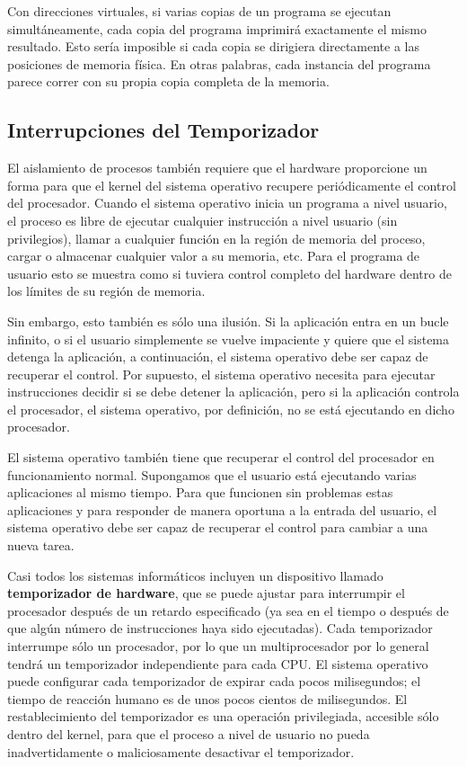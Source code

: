 \documentclass[10pt]{book}
\begin{document}
Con direcciones virtuales, si varias copias de un programa se ejecutan simultáneamente, cada copia del programa imprimirá exactamente el mismo resultado. Esto sería imposible si cada copia se dirigiera directamente a las posiciones de memoria física. En otras palabras, cada instancia del programa parece correr con su propia copia completa de la memoria.


\subsection{Interrupciones del Temporizador}
El aislamiento de procesos también requiere que el hardware proporcione un forma para que el kernel del sistema operativo recupere periódicamente el control del procesador. Cuando el sistema operativo inicia un programa a nivel usuario, el proceso es libre de ejecutar cualquier instrucción a nivel usuario (sin privilegios), llamar a cualquier función en la región de memoria del proceso, cargar o almacenar cualquier valor a su memoria, etc. Para el programa de usuario esto se muestra como si tuviera control completo del hardware dentro de los límites de su región de memoria.

Sin embargo, esto también es sólo una ilusión. Si la aplicación entra en un bucle infinito, o si el usuario simplemente se vuelve impaciente y quiere que el sistema detenga la aplicación, a continuación, el sistema operativo debe ser capaz de recuperar el control. Por supuesto, el sistema operativo necesita para ejecutar instrucciones decidir si se debe detener la aplicación, pero si la aplicación controla el procesador, el sistema operativo, por definición, no se está ejecutando en dicho procesador.

El sistema operativo también tiene que recuperar el control del procesador en funcionamiento normal. Supongamos que el usuario está ejecutando varias aplicaciones al mismo tiempo. Para que funcionen sin problemas estas aplicaciones y para responder de manera oportuna a la entrada del usuario, el sistema operativo debe ser capaz de recuperar el control para cambiar a una nueva tarea.

Casi todos los sistemas informáticos incluyen un dispositivo llamado \textbf{temporizador de hardware}, que se puede ajustar para interrumpir el procesador después de un retardo especificado (ya sea en el tiempo o después de que algún número de instrucciones haya sido ejecutadas). Cada temporizador interrumpe sólo un procesador, por lo que un multiprocesador por lo general tendrá un temporizador independiente para cada CPU. El sistema operativo puede configurar cada temporizador de expirar cada pocos milisegundos; el tiempo de reacción humano es de unos pocos cientos de milisegundos. El restablecimiento del temporizador es una operación privilegiada, accesible sólo dentro del kernel, para que el proceso a nivel de usuario no pueda inadvertidamente o maliciosamente desactivar el temporizador.
\end{document}
